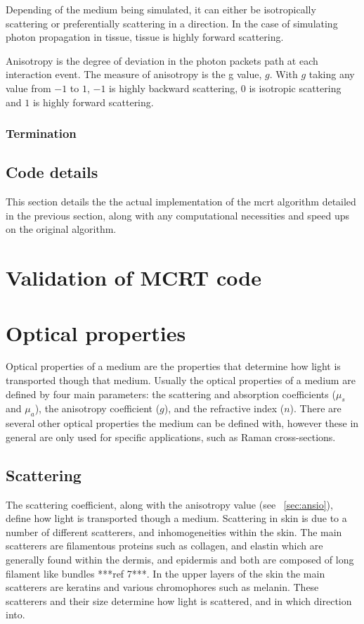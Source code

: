 Depending of the medium being simulated, it can either be isotropically scattering or preferentially scattering in a direction. In the case of simulating photon propagation in tissue, tissue is highly forward scattering.

Anisotropy is the degree of deviation in the photon packets path at each interaction event. The measure of anisotropy is the g value, $g$. With $g$ taking any value from $-1$ to $1$, $-1$ is highly backward scattering, $0$ is isotropic scattering and $1$ is highly forward scattering. 


\subsubsection{Termination}\label{sec:terminator}

\subsection{Code details}

This section details the the actual implementation of the \gls{mcrt} algorithm detailed in the previous section, along with any computational necessities and speed ups on the original algorithm.

\section{Validation of MCRT code}
\section{Optical properties}\label{sec:optprop}

Optical properties of a medium are the properties that determine how light is transported though that medium. Usually the optical properties of a medium are defined by four main parameters: the scattering and absorption coefficients ($\mu_s$ and $\mu_a$), the anisotropy coefficient ($g$), and the refractive index ($n$). There are several other optical properties the medium can be defined with, however these in general are only used for specific applications, such as Raman cross-sections.

\subsection{Scattering}\label{sec:scatt}

The scattering coefficient, along with the anisotropy value (see ~\cref{sec:ansio}), define how light is transported though a medium. Scattering in skin is due to a number of different scatterers, and inhomogeneities within the skin. The main scatterers are filamentous proteins such as collagen, and elastin which are generally found within the dermis, and epidermis and both are composed of long filament like bundles ***ref 7***. In the upper layers of the skin the main scatterers are keratins and various chromophores such as melanin. These scatterers and their size determine how light is scattered, and in which direction into.

